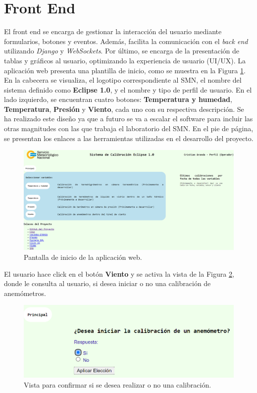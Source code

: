 \section{Front End}\label{sec:frontEnd}

El front end se encarga de gestionar la interacción del usuario mediante formularios, botones y eventos. Además, facilita la comunicación con el \textit{back end} utilizando \textit{Django} y \textit{WebSockets}. Por último, se encarga de la presentación de tablas y gráficos al usuario, optimizando la experiencia de usuario (UI/UX). La aplicación web presenta una plantilla de inicio, como se muestra en la Figura \ref{fig:index}. En la cabecera se visualiza, el logotipo correspondiente al SMN, el nombre del sistema definido como \textbf{Eclipse 1.0}, y el nombre y tipo de perfil de usuario. En el lado izquierdo, se encuentran cuatro botones: \textbf{Temperatura y humedad}, \textbf{Temperatura}, \textbf{Presión} y \textbf{Viento}, cada uno con su respectiva descripción. Se ha realizado este diseño ya que a futuro se va a escalar el software para incluir las otras magnitudes con las que trabaja el laboratorio del SMN. En el pie de página, se presentan los enlaces a las herramientas utilizadas en el desarrollo del proyecto.
\begin{figure}[H]
    \centering
    \includegraphics[width=1\linewidth]{Figuras/AplicacionWeb/frontend/index.png}
    \caption{Pantalla de inicio de la aplicación web.}
    \label{fig:index}
\end{figure}
El usuario hace click en el botón \textbf{Viento} y se activa la vista de la Figura \ref{fig:iniciarCalibViento}, donde le consulta al usuario, si desea iniciar o no una calibración de anemómetros.
\begin{figure}[H]
    \centering
    \includegraphics[width=0.7\linewidth]{Figuras/AplicacionWeb/frontend/iniciarCalibViento.png}
    \caption{Vista para confirmar si se desea realizar o no una calibración.}
    \label{fig:iniciarCalibViento}
\end{figure}
